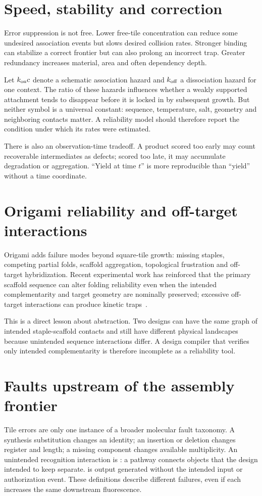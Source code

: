 \section{Speed, stability and correction}

Error suppression is not free. Lower free-tile concentration can reduce some
undesired association events but slows desired collision rates. Stronger binding can
stabilize a correct frontier but can also prolong an incorrect trap. Greater
redundancy increases material, area and often dependency depth.

Let $k_{\rm on}c$ denote a schematic association hazard and $k_{\rm off}$ a
dissociation hazard for one context. The ratio of these hazards influences whether a
weakly supported attachment tends to disappear before it is locked in by subsequent
growth. But neither symbol is a universal constant: sequence, temperature, salt,
geometry and neighboring contacts matter. A reliability model should therefore
report the condition under which its rates were estimated.

There is also an observation-time tradeoff. A product scored too early may count
recoverable intermediates as defects; scored too late, it may accumulate degradation
or aggregation. ``Yield at time $t$'' is more reproducible than ``yield'' without a
time coordinate.

\section{Origami reliability and off-target interactions}

Origami adds failure modes beyond square-tile growth: missing staples, competing
partial folds, scaffold aggregation, topological frustration and off-target
hybridization. Recent experimental work has reinforced that the primary scaffold
sequence can alter folding reliability even when the intended complementarity and
target geometry are nominally preserved; excessive off-target interactions can
produce kinetic traps~\cite{ShirtEdiss2026}.

This is a direct lesson about abstraction. Two designs can have the same graph of
intended staple-scaffold contacts and still have different physical landscapes
because unintended sequence interactions differ. A design compiler that verifies
only intended complementarity is therefore incomplete as a reliability tool.

\section{Faults upstream of the assembly frontier}
Tile errors are only one instance of a broader molecular fault taxonomy.
A synthesis substitution changes an identity; an insertion or deletion changes
register and length; a missing component changes available multiplicity.
An unintended recognition interaction is : a pathway connects
objects that the design intended to keep separate.  is output generated
without the intended input or authorization event. These definitions describe
different failures, even if each increases the same downstream fluorescence.

